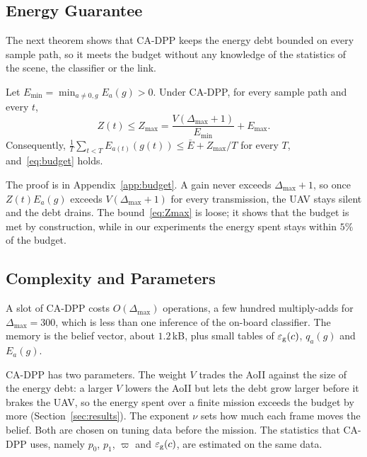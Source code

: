 \subsection{Energy Guarantee}
The next theorem shows that CA-DPP keeps the energy debt bounded on every sample path, so it meets the budget without any knowledge of the statistics of the scene, the classifier or the link.

\begin{theorem}[Budget]\label{thm:budget}
Let $E_{\min}=\min_{a\neq0,g}E_a(g)>0$. Under CA-DPP, for every sample path and every $t$,
\begin{equation}\label{eq:Zmax}
Z(t)\le Z_{\max}=\frac{V(\Delta_{\max}+1)}{E_{\min}}+E_{\max}.
\end{equation}
Consequently, $\frac1T\sum_{t<T}E_{a(t)}(g(t))\le\bar E+Z_{\max}/T$ for every $T$, and~\eqref{eq:budget} holds.
\end{theorem}

The proof is in Appendix~\ref{app:budget}. A gain never exceeds $\Delta_{\max}+1$, so once $Z(t)E_a(g)$ exceeds $V(\Delta_{\max}+1)$ for every transmission, the UAV stays silent and the debt drains. The bound~\eqref{eq:Zmax} is loose; it shows that the budget is met by construction, while in our experiments the energy spent stays within $5\%$ of the budget.

\subsection{Complexity and Parameters}
A slot of CA-DPP costs $O(\Delta_{\max})$ operations, a few hundred multiply-adds for $\Delta_{\max}=300$, which is less than one inference of the on-board classifier. The memory is the belief vector, about $1.2$\,kB, plus small tables of $\varepsilon_{\rm g}(c)$, $q_a(g)$ and $E_a(g)$.

CA-DPP has two parameters. The weight $V$ trades the AoII against the size of the energy debt: a larger $V$ lowers the AoII but lets the debt grow larger before it brakes the UAV, so the energy spent over a finite mission exceeds the budget by more (Section~\ref{sec:results}). The exponent $\nu$ sets how much each frame moves the belief. Both are chosen on tuning data before the mission. The statistics that CA-DPP uses, namely $p_0$, $p_1$, $\varpi$ and $\varepsilon_{\rm g}(c)$, are estimated on the same data.

